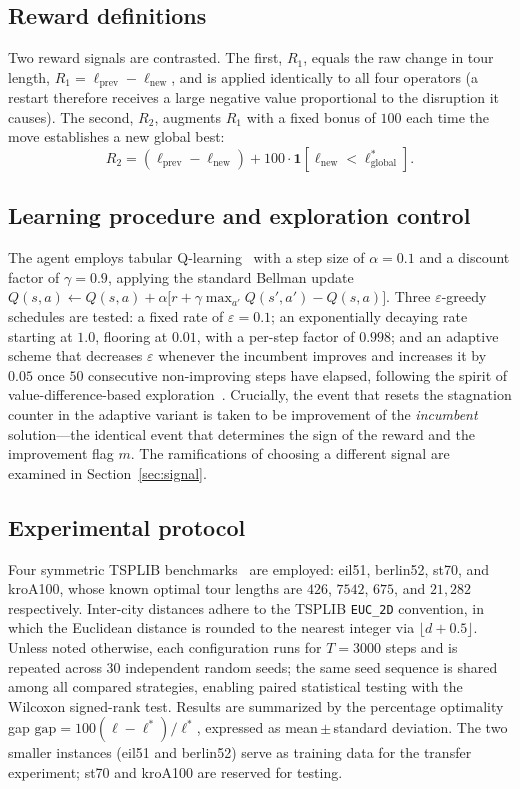 \documentclass[10pt,twocolumn]{article}
\begin{document}
\subsection{Reward definitions}
Two reward signals are contrasted. The first, $R_1$, equals the raw change in
tour length,
$R_1=\ell_{\mathrm{prev}}-\ell_{\mathrm{new}}$, and is applied identically to
all four operators (a restart therefore receives a large negative value
proportional to the disruption it causes).
The second, $R_2$, augments $R_1$ with a fixed bonus of $100$ each time the
move establishes a new global best:
\[
R_2 = (\ell_{\mathrm{prev}}-\ell_{\mathrm{new}})
      + 100\cdot\mathbf{1}\!\left[\ell_{\mathrm{new}}<\ell^{*}_{\mathrm{global}}\right].
\]

\subsection{Learning procedure and exploration control}
The agent employs tabular Q-learning~\cite{watkins1992} with a step size of
$\alpha=0.1$ and a discount factor of $\gamma=0.9$, applying the standard
Bellman update
$Q(s,a)\leftarrow Q(s,a)+\alpha\bigl[r+\gamma\max_{a'}Q(s',a')-Q(s,a)\bigr]$.
Three $\varepsilon$-greedy schedules are tested: a fixed rate of
$\varepsilon=0.1$; an exponentially decaying rate starting at $1.0$, flooring
at $0.01$, with a per-step factor of $0.998$; and an adaptive scheme that
decreases $\varepsilon$ whenever the incumbent improves and increases it by
$0.05$ once $50$ consecutive non-improving steps have elapsed, following the
spirit of value-difference-based exploration~\cite{tokic2010}. Crucially, the
event that resets the stagnation counter in the adaptive variant is taken to be
improvement of the \emph{incumbent} solution---the identical event that
determines the sign of the reward and the improvement flag $m$. The
ramifications of choosing a different signal are examined in
Section~\ref{sec:signal}.

\subsection{Experimental protocol}
Four symmetric TSPLIB benchmarks~\cite{reinelt1991} are employed: eil51,
berlin52, st70, and kroA100, whose known optimal tour lengths are $426$,
$7542$, $675$, and $21{,}282$ respectively. Inter-city distances adhere to the
TSPLIB \texttt{EUC\_2D} convention, in which the Euclidean distance is rounded
to the nearest integer via $\lfloor d+0.5\rfloor$. Unless noted otherwise, each
configuration runs for $T=3000$ steps and is repeated across $30$ independent
random seeds; the same seed sequence is shared among all compared strategies,
enabling paired statistical testing with the Wilcoxon signed-rank test. Results
are summarized by the percentage optimality gap
$\mathrm{gap}=100(\ell-\ell^{*})/\ell^{*}$, expressed as
mean\,$\pm$\,standard deviation. The two smaller instances (eil51 and berlin52)
serve as training data for the transfer experiment; st70 and kroA100 are
reserved for testing.
\end{document}
